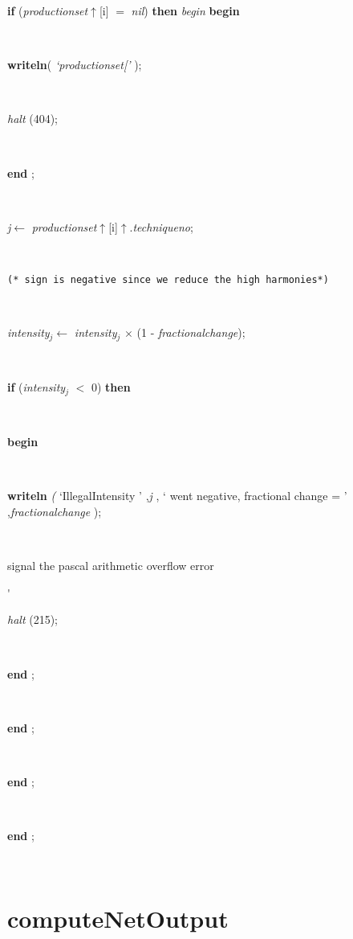 \begin{tabbing}
\+\<\parbox{14cm}{\textsf {\textbf {if } \textsf{(\textit{productionset}$\uparrow$\textit{}[i] $=$ \textit{nil})} \textbf{ then } \textsf{\textit{begin}} \textbf{ begin } }}\\
\parbox{14cm}{\textsf{\textbf{writeln}(\textit{\textrm{\textup { `productionset[' } }})}; }\\
\parbox{14cm}{\textsf{\textit{halt} (404)}; }\\
\<\-\parbox{14cm}{\textsf{\textbf{end} ;}}\\
\parbox{14cm}{\textsf{\textit{j}$\leftarrow$ \textit{productionset}$\uparrow$\textit{}[i]$\uparrow$.\textit{techniqueno}}; }\\
\parbox{14cm}{\texttt{\small{(* sign is negative since we reduce the high harmonies*)}}}\\
\parbox{14cm}{\textsf{\textit{intensity}$_{\textit{j}}$$\leftarrow$ \textit{intensity}$_{\textit{j}}$ $\times$ (1 - \textit{fractionalchange})}; }\\
\+\parbox{14cm}{\textsf {\textbf {if } \textsf{(\textit{intensity}$_{\textit{j}}$ $<$ 0)} \textbf{ then } }}\\
\<\parbox{14cm}{\textsf{\textbf{begin} }}\\
\parbox{14cm}{\textsf{\textbf{writeln} \textit{(} \textrm{\textup { `IllegalIntensity  ' } },\textit{j} ,\textrm{\textup { ` went negative, fractional change = ' } },\textit{fractionalchange} );}}\\
\<\<\<\<\<\<\<\parbox{3.5cm}{\scriptsize{signal the pascal arithmetic overflow error}}\'\>\>\>\>\>\>\>\parbox{14cm}{\textsf{\textit{halt} (215)}; }\\
\<\-\parbox{14cm}{\textsf{\textbf{end} ;}}\\
\<\-\parbox{14cm}{\textsf{\textbf{end} ;}}\\
\<\-\<\-\parbox{14cm}{\textsf{\textbf{end} ;}}\\
\<\-\parbox{14cm}{\textsf{\textbf{end} ;}}\\
\end{tabbing}
\section{computeNetOutput}\label{sec:harmonycomputeNetOutput}

